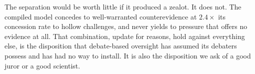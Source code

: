 The separation would be worth little if it produced a zealot. It does not. The compiled
model concedes to well-warranted counterevidence at \(2.4\times\) its concession rate to
hollow challenges, and never yields to pressure that offers no evidence at all. That
combination, update for reasons, hold against everything else, is the disposition that
debate-based oversight has assumed its debaters possess and has had no way to install.
It is also the disposition we ask of a good juror or a good scientist.
